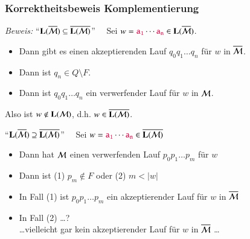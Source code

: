 \documentclass[onlymath]{beamer}
\begin{document}
\begin{frame}\frametitle{Korrektheitsbeweis Komplementierung}

\pause

\emph{Beweis:} "`$\textbf{\textcolor{black}{L}}(\overline{\mathcal{M}}) \subseteq \overline{\textbf{\textcolor{black}{L}}(\mathcal{M})}$"'~~
Sei $w=\mathtt{\textcolor{purple}{a_1}}\cdots\mathtt{\textcolor{purple}{a_n}}\in\textbf{\textcolor{black}{L}}(\overline{\mathcal{M}})$.\pause
\begin{itemize}
\item Dann gibt es einen akzeptierenden Lauf $q_0q_1\ldots q_n$ für $w$ in $\overline{\mathcal{M}}$.\pause
\item Dann ist $q_n\in Q\setminus F$.\pause
\item Dann ist $q_0q_1\ldots q_n$ ein verwerfender Lauf für $w$ in $\mathcal{M}$.\pause
\end{itemize}
Also ist $w\notin{\textbf{\textcolor{black}{L}}(\ensuremath{\mathcal{M}})}$, d.h. $w\in\overline{\textbf{\textcolor{black}{L}}(\mathcal{M})}$.\pause
\bigskip

"`$\textbf{\textcolor{black}{L}}(\overline{\mathcal{M}}) \supseteq \overline{\textbf{\textcolor{black}{L}}(\mathcal{M})}$"'~~
Sei $w=\mathtt{\textcolor{purple}{a_1}}\cdots\mathtt{\textcolor{purple}{a_n}}\in\overline{\textbf{\textcolor{black}{L}}(\mathcal{M})}$\pause

\begin{itemize}
\item Dann hat $\mathcal{M}$ einen verwerfenden Lauf $p_0p_1\ldots p_m$ für $w$\pause
\item Dann ist (1) $p_m\notin F$ oder (2) $m<|w|$\pause
\item In Fall (1) ist $p_0p_1\ldots p_m$ ein akzeptierender Lauf für $w$ in $\overline{\mathcal{M}}$\pause
\item In Fall (2) \ldots ?\pause\\
\ldots vielleicht gar kein akzeptierender Lauf für $w$ in $\overline{\mathcal{M}}$ \ldots \pause
\end{itemize}


\end{frame}
\end{document}
